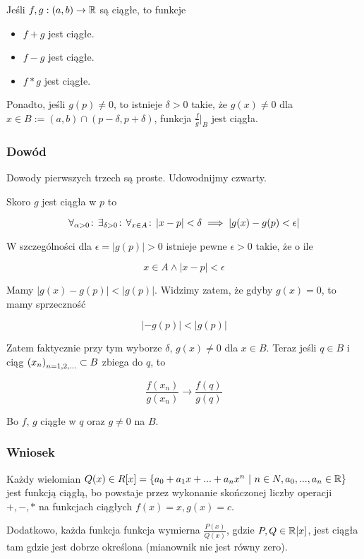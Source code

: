 \documentclass[9pt]{article}
\begin{document}
Jeśli $f, g: (a,b) \to \mathbb{R}$ są ciągłe, to funkcje
\begin{itemize}
    \item $f+g$ jest ciągłe.
    \item $f-g$ jest ciągłe.
    \item $f*g$ jest ciągłe.
\end{itemize}

Ponadto, jeśli $g(p) \ne 0$, to istnieje $\delta > 0$ takie, że $g(x) \ne 0$ dla $x \in B := (a,b)
\cap (p-\delta, p + \delta)$, funkcja $\frac{f}{g}|_B$ jest ciągła.

\subsubsection*{Dowód}

Dowody pierwszych trzech są proste. Udowodnijmy czwarty.

Skoro $g$ jest ciągła  w $p$ to

\[
    \forall_{\alpha > 0} \! : \, \exists_{\delta > 0} \! : \, \forall_{x \in A} \! : \, |x-p| < \delta \implies \left|g(x)-g(p) <
    \epsilon \right|
\]

W szczególności dla $\epsilon = |g(p)| > 0$ istnieje pewne $\epsilon > 0$ takie, że o ile

\[
    x \in A \land |x - p| < \epsilon 
\]

Mamy $|g(x) - g(p)| < |g(p)|$. Widzimy zatem, że gdyby $g(x) = 0$, to mamy sprzeczność

\[
    |-g(p)| < |g(p)|
\]

Zatem faktycznie przy tym wyborze $\delta$, $g(x) \ne 0$ dla $x \in B$. Teraz jeśli $q \in B$ i ciąg
$\left(x_n\right)_{n = 1,2,...} \subset B$ zbiega do $q$, to 

\[
    \frac{f(x_n)}{g(x_n)} \to \frac{f(q)}{g(q)}
\]

Bo $f$, $g$ ciągłe w $q$ oraz $g \ne 0$ na $B$.

\subsubsection*{Wniosek}

Każdy wielomian $Q(x) \in R[x] = \left\{a_0 + a_1 x + ... + a_n x^n \ |\  n \in N, a_0, ..., a_n \in
\mathbb{R} \right\}$  jest funkcją ciągłą, bo powstaje przez wykonanie skończonej liczby operacji $+, -, *$
na funkcjach ciągłych $f(x)=x, g(x) = c$.

\bigbreak

Dodatkowo, każda funkcja funkcja wymierna $\frac{P(x)}{Q(x)}$, gdzie $P, Q \in \mathbb{R}[x]$, jest ciągła
tam gdzie jest dobrze określona (mianownik nie jest równy zero).
\end{document}
